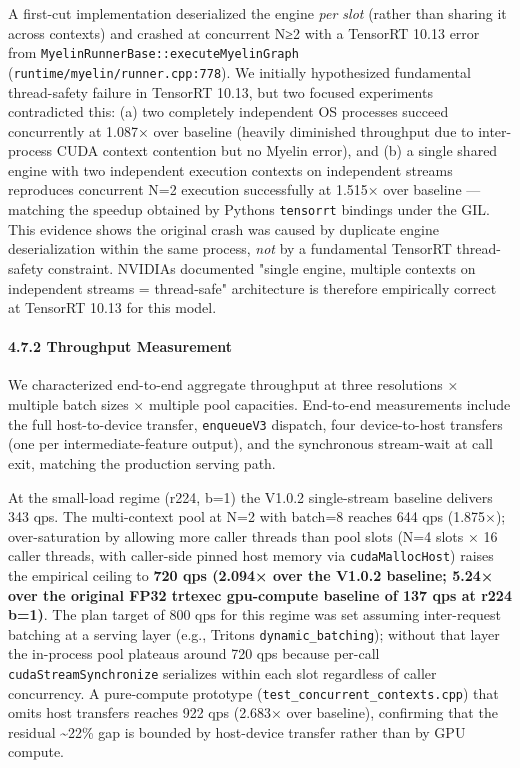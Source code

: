 \documentclass[
]{article}
\begin{document}
A first-cut implementation deserialized the engine \emph{per slot}
(rather than sharing it across contexts) and crashed at concurrent N≥2
with a TensorRT 10.13 error from
\texttt{MyelinRunnerBase::executeMyelinGraph}
(\texttt{runtime/myelin/runner.cpp:778}). We initially hypothesized
fundamental thread-safety failure in TensorRT 10.13, but two focused
experiments contradicted this: (a) two completely independent OS
processes succeed concurrently at 1.087× over baseline (heavily
diminished throughput due to inter-process CUDA context contention but
no Myelin error), and (b) a single shared engine with two independent
execution contexts on independent streams reproduces concurrent N=2
execution successfully at 1.515× over baseline --- matching the speedup
obtained by Python\textquotesingle s \texttt{tensorrt} bindings under
the GIL. This evidence shows the original crash was caused by duplicate
engine deserialization within the same process, \emph{not} by a
fundamental TensorRT thread-safety constraint. NVIDIA\textquotesingle s
documented "single engine, multiple contexts on independent streams =
thread-safe" architecture is therefore empirically correct at TensorRT
10.13 for this model.

\paragraph{4.7.2 Throughput
Measurement}\label{472-throughput-measurement}

We characterized end-to-end aggregate throughput at three resolutions ×
multiple batch sizes × multiple pool capacities. End-to-end measurements
include the full host-to-device transfer, \texttt{enqueueV3} dispatch,
four device-to-host transfers (one per intermediate-feature output), and
the synchronous stream-wait at call exit, matching the production
serving path.

At the small-load regime (r224, b=1) the V1.0.2 single-stream baseline
delivers 343 qps. The multi-context pool at N=2 with batch=8 reaches 644
qps (1.875×); over-saturation by allowing more caller threads than pool
slots (N=4 slots × 16 caller threads, with caller-side pinned host
memory via \texttt{cudaMallocHost}) raises the empirical ceiling to
\textbf{720 qps (2.094× over the V1.0.2 baseline; 5.24× over the
original FP32 trtexec gpu-compute baseline of 137 qps at r224 b=1)}. The
plan target of 800 qps for this regime was set assuming inter-request
batching at a serving layer (e.g., Triton\textquotesingle s
\texttt{dynamic\_batching}); without that layer the in-process pool
plateaus around 720 qps because per-call \texttt{cudaStreamSynchronize}
serializes within each slot regardless of caller concurrency. A
pure-compute prototype (\texttt{test\_concurrent\_contexts.cpp}) that
omits host transfers reaches 922 qps (2.683× over baseline), confirming
that the residual \textasciitilde22\% gap is bounded by host-device
transfer rather than by GPU compute.
\end{document}
